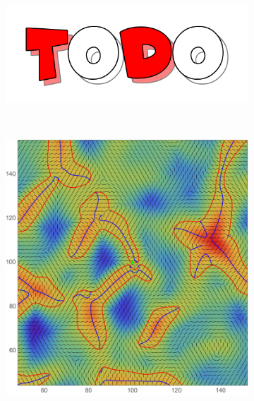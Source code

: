 \documentclass[a4paper, 11pt]{article}
\begin{document}
\begin{figure}
\begin{subfigure}[b]{0.3\textwidth}
\end{subfigure}~
\begin{subfigure}[b]{0.3\textwidth}
\includegraphics[width=\textwidth]{Todo}
\end{subfigure}\\
\begin{subfigure}[b]{0.3\textwidth}
\includegraphics[width=\textwidth]{Swallowtail_L}
\end{subfigure}~
\begin{subfigure}[b]{0.3\textwidth}

\end{subfigure}
\end{figure}
\end{document}

